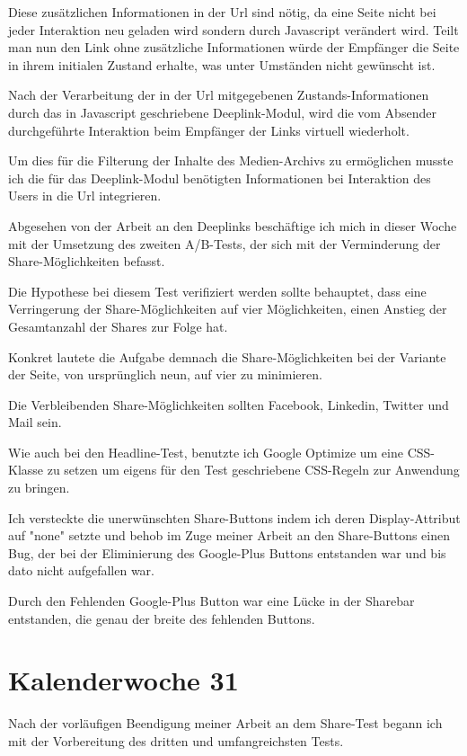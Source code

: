 \documentclass[11pt]{article} %
\begin{document}
Diese zusätzlichen Informationen in der Url sind nötig, da eine Seite nicht bei jeder Interaktion neu geladen wird sondern durch Javascript verändert wird. Teilt man nun den Link ohne zusätzliche Informationen würde der Empfänger die Seite in ihrem initialen Zustand erhalte, was unter Umständen nicht gewünscht ist.

Nach der Verarbeitung der in der Url mitgegebenen Zustands-Informationen durch das in Javascript geschriebene Deeplink-Modul, wird die vom Absender durchgeführte Interaktion beim Empfänger der Links virtuell wiederholt.

Um dies für die Filterung der Inhalte des Medien-Archivs zu ermöglichen musste ich die für das Deeplink-Modul benötigten Informationen bei Interaktion des Users in die Url integrieren.

Abgesehen von der Arbeit an den Deeplinks beschäftige ich mich in dieser Woche mit der Umsetzung des zweiten A/B-Tests, der sich mit der Verminderung der Share-Möglichkeiten befasst.

Die Hypothese bei diesem Test verifiziert werden sollte behauptet, dass eine Verringerung der Share-Möglichkeiten auf vier Möglichkeiten, einen Anstieg der Gesamtanzahl der Shares zur Folge hat.

Konkret lautete die Aufgabe demnach die Share-Möglichkeiten bei der Variante der Seite, von ursprünglich neun, auf vier zu minimieren.

Die Verbleibenden Share-Möglichkeiten sollten Facebook, Linkedin, Twitter und Mail sein.

Wie auch bei den Headline-Test, benutzte ich Google Optimize um eine CSS-Klasse zu setzen um eigens für den Test geschriebene CSS-Regeln zur Anwendung zu bringen.

Ich versteckte die unerwünschten Share-Buttons indem ich deren Display-Attribut auf "none" setzte und behob im Zuge meiner Arbeit an den Share-Buttons einen Bug, der bei der Eliminierung des Google-Plus Buttons entstanden war und bis dato nicht aufgefallen war.

Durch den Fehlenden Google-Plus Button war  eine Lücke in der Sharebar entstanden, die genau der breite des fehlenden Buttons. 

\section{Kalenderwoche 31} \label{sec:kw31}

Nach der vorläufigen Beendigung meiner Arbeit an dem Share-Test begann ich mit der Vorbereitung des dritten und umfangreichsten Tests.
\end{document}
